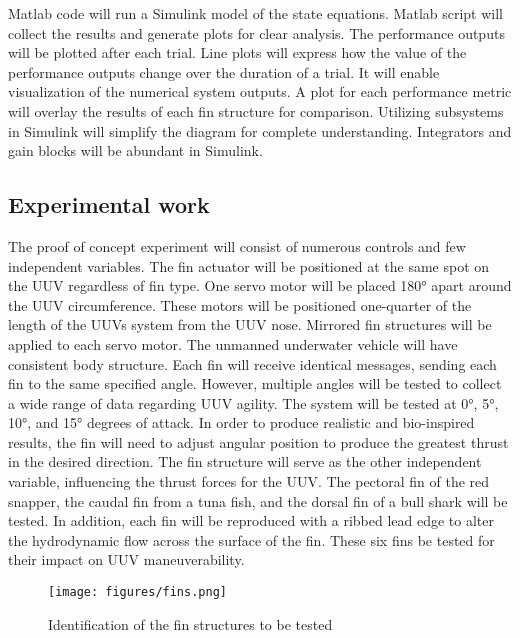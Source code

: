 \documentclass{IEEEtran}
\begin{document}
Matlab code will run a Simulink model of the state equations.  Matlab script will collect the results and generate plots for clear analysis.  The performance outputs will be plotted after each trial.  Line plots will express how the value of the performance outputs change over the duration of a trial.  It will enable visualization of the numerical system outputs.  A plot for each performance metric will overlay the results of each fin structure for comparison.  Utilizing subsystems in Simulink will simplify the diagram for complete understanding.  Integrators and gain blocks will be abundant in Simulink.

\subsection{Experimental work}
The proof of concept experiment will consist of numerous controls and few independent variables.  The fin actuator will be positioned at the same spot on the UUV regardless of fin type.  One servo motor will be placed \ang{180} apart around the UUV circumference.  These motors will be positioned one-quarter of the length of the UUVs system from the UUV nose.  Mirrored fin structures will be applied to each servo motor.  The unmanned underwater vehicle will have consistent body structure.  Each fin will receive identical messages, sending each fin to the same specified angle.  However, multiple angles will be tested to collect a wide range of data regarding UUV agility.  The system will be tested at \ang{0}, \ang{5}, \ang{10}, and \ang{15} degrees of attack.  In order to produce realistic and bio-inspired results, the fin will need to adjust angular position to produce the greatest thrust in the desired direction.  The fin structure will serve as the other independent variable, influencing the thrust forces for the UUV.  The pectoral fin of the red snapper, the caudal fin from a tuna fish, and the dorsal fin of a bull shark will be tested.  In addition, each fin will be reproduced with a ribbed lead edge to alter the hydrodynamic flow across the surface of the fin.  These six fins be tested for their impact on UUV maneuverability.  
\begin{figure}
\begin{center}
\texttt{[image: figures/fins.png]}
\end{center}
\caption{Identification of the fin structures to be tested}
\label{fig:5}
\end{figure}
\end{document}
